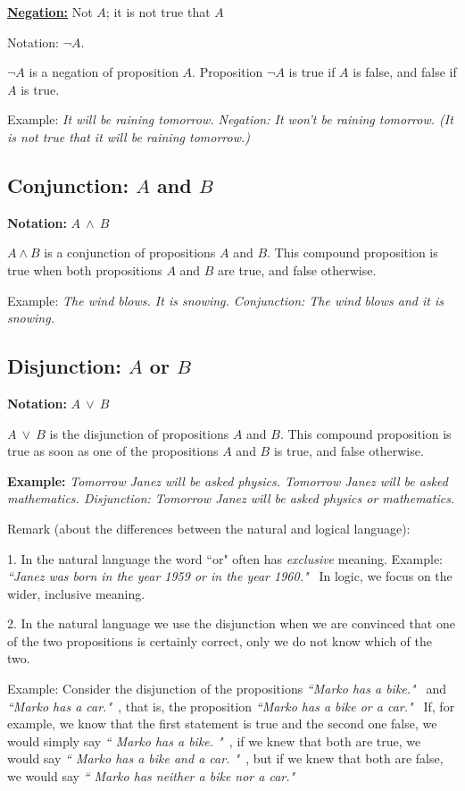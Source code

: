 \documentclass[11pt,paper=b5,footinclude,headinclude]{scrbook} %
\def\ali {{~\vee~}}
\def\inn {{~\wedge~}}
\theoremstyle{remark}
\theoremstyle{definition} %
\begin{document}
\medskip
{\textbf \underline{Negation:}}
Not $A$; it is not true that $A$

Notation: $\neg A$.

$\neg A$ is a negation of proposition $A$. Proposition $\neg A$ is true if $A$ is false, and false if $A$ is true.

Example: {\em It will be raining tomorrow. Negation: It won't be raining tomorrow. (It is not true that it will be raining tomorrow.)}

\medskip
\subsection{Conjunction: $A$ and $B$}

\textbf{Notation:} $A\inn  B$

$A\wedge B$ is a conjunction of propositions $A$ and $B$.
This compound proposition is true
when both propositions $A$ and $B$ are true, and false otherwise.

Example: {\em The wind blows. It is snowing. Conjunction: The wind blows and it is snowing.}

\medskip
\subsection{Disjunction: $A$ or $B$} 

\textbf{Notation:} $A\ali B$

$A\ali B$ is the disjunction of propositions $A$ and $B$.
This compound proposition is true
as soon as one of the propositions $A$ and $B$ is true, and false otherwise.

\textbf{Example:} {\em
Tomorrow Janez will be asked physics.
Tomorrow Janez will be asked mathematics.
Disjunction:
Tomorrow Janez will be asked physics or mathematics.}

\medskip
Remark (about the differences between the natural and logical language):

1. In the natural language the word ``or" often has {\em exclusive} meaning.
Example: {\em ``Janez was born in the year 1959 or in the year 1960."~}
In logic, we focus on the wider, inclusive meaning.

2. In the natural language we use the disjunction when we are convinced that one of the two propositions is certainly correct,
only we do not know which of the two.

Example: Consider the disjunction of the propositions
{\em ``Marko has a bike."~} and {\em ``Marko has a car."~}, that is,
the proposition
{\em ``Marko has a bike or a car."~}
If, for example, we know
that the first statement is true and the second one false, we would simply say
{\em `` Marko has a bike. "~}, if we knew that both are true, we would say
{\em `` Marko has a bike and a car. "~}, but if we knew that both are false, we would say
{\em `` Marko has neither a bike nor a car."~}
\end{document}
